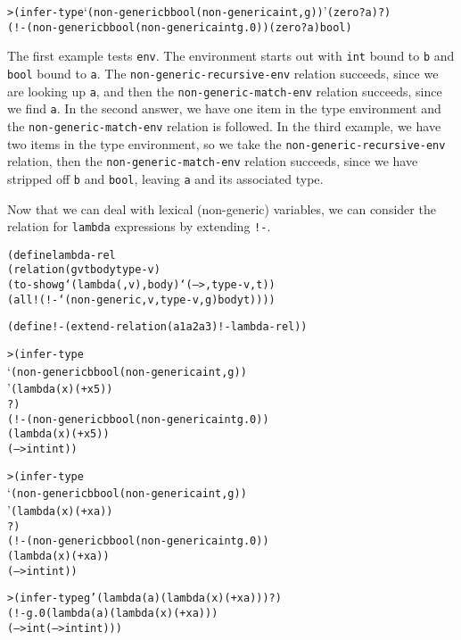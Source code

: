 \begin{alltt}
> (infer-type `(non-generic b bool (non-generic a int ,g)) '(zero? a) ?)
(!- (non-generic b bool (non-generic a int g.0)) (zero? a) bool)
\end{alltt}

The first example tests \texttt{env}.  The environment starts out with
\texttt{int} bound to \texttt{b} and \texttt{bool} bound to
\texttt{a}.  The \texttt{non-generic-recursive-env} relation succeeds,
since we are looking up \texttt{a}, and then the
\texttt{non-generic-match-env} relation succeeds, since we find
\texttt{a}.  In the second answer, we have one item in the type
environment and the \texttt{non-generic-match-env} relation is
followed. In the third example, we have two items in the type
environment, so we take the \texttt{non-generic-recursive-env} relation,
then the \texttt{non-generic-match-env} relation succeeds,
since we have stripped off \texttt{b} and \texttt{bool}, leaving
\texttt{a} and its associated type.

Now that we can deal with lexical (non-generic) variables, we can
consider the relation for \texttt{lambda} expressions by extending
\texttt{!-}.

\begin{alltt}
(define lambda-rel
  (relation (g v t body type-v)
    (to-show g `(lambda (,v) ,body) `(--> ,type-v ,t))
    (all! (!- `(non-generic ,v ,type-v ,g) body t))))

(define !- (extend-relation (a1 a2 a3) !- lambda-rel))
\end{alltt}

\begin{alltt}
> (infer-type
    `(non-generic b bool (non-generic a int ,g))
    '(lambda (x) (+ x 5))
    ?)
(!- (non-generic b bool (non-generic a int g.0))
    (lambda (x) (+ x 5))
    (--> int int))
\end{alltt}

\begin{alltt}
> (infer-type
    `(non-generic b bool (non-generic a int ,g))
    '(lambda (x) (+ x a))
    ?)
(!- (non-generic b bool (non-generic a int g.0))
    (lambda (x) (+ x a))
    (--> int int))
\end{alltt}

\begin{alltt}
> (infer-type g '(lambda (a) (lambda (x) (+ x a))) ?)
(!- g.0 (lambda (a) (lambda (x) (+ x a)))
        (--> int (--> int int)))
\end{alltt}

